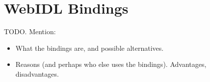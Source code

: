 \section{WebIDL Bindings} %
\label{sec:webidl_bindings}

TODO. Mention:
\begin{itemize}
	\item What the bindings are, and possible alternatives.
	\item Reasons (and perhaps who else uses the bindings). Advantages, disadvantages.
\end{itemize}

